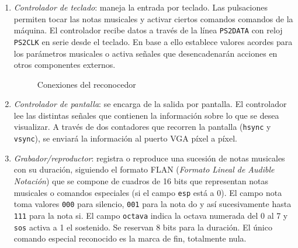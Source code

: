\documentclass{article}
\begin{document}
\begin{enumerate}
	\item {\itshape Controlador de teclado}: maneja la entrada por teclado. Las pulsaciones permiten tocar las notas musicales y activar ciertos comandos comandos de la máquina. El controlador recibe datos a través de la línea \verb|PS2DATA| con reloj \verb|PS2CLK| en serie desde el teclado. En base a ello establece valores acordes para los parámetros musicales o activa señales que desencadenarán acciones en otros componentes externos.

\begin{figure}[ht]\centering

	\caption{Conexiones del reconocedor}
	\label{fig:reconocedor}
\end{figure}

	\item {\itshape Controlador de pantalla}: se encarga de la salida por pantalla. El controlador lee las distintas señales que contienen la información sobre lo que se desea visualizar. A través de dos contadores que recorren la pantalla (\verb|hsync| y \verb|vsync|), se enviará la información al puerto VGA píxel a píxel.

	\item {\itshape Grabador/reproductor}: registra o reproduce una sucesión de notas musicales con su duración, siguiendo el formato FLAN ({\itshape Formato Lineal de Audible Notación}) que se compone de cuadros de 16 bits que representan notas musicales o comandos especiales (si el campo \verb|esp| está a 0). El campo nota toma valores \verb|000| para silencio, \verb|001| para la nota do y así sucesivamente hasta \verb|111| para la nota si. El campo \verb|octava| indica la octava numerada del 0 al 7 y \verb|sos| activa a 1 el sostenido. Se reservan 8 bits para la duración. El único comando especial reconocido es la marca de fin, totalmente nula. 


\end{enumerate}
\end{document}
